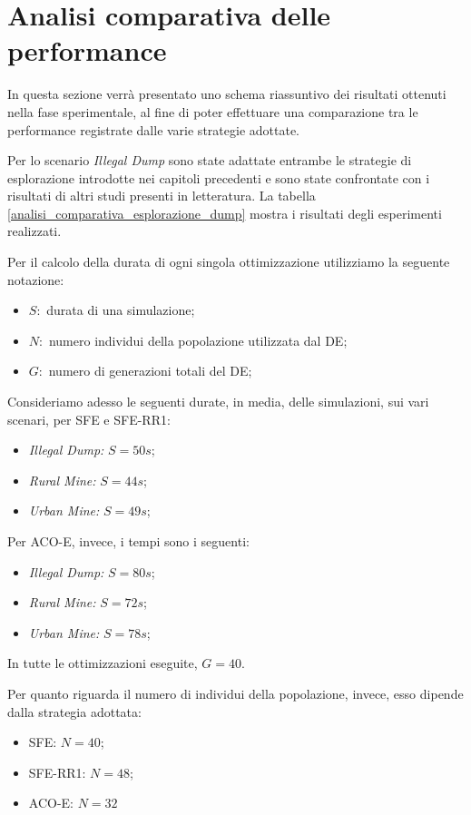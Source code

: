 \newpage
\section{Analisi comparativa delle performance}

In questa sezione verrà presentato uno schema riassuntivo dei risultati ottenuti nella fase sperimentale, al fine di poter effettuare una comparazione tra le performance registrate dalle varie strategie adottate.

Per lo scenario \textit{Illegal Dump} sono state adattate entrambe le strategie di esplorazione introdotte nei capitoli precedenti e sono state confrontate con i risultati di altri studi presenti in letteratura.
La tabella \ref{analisi_comparativa_esplorazione_dump} mostra i risultati degli esperimenti realizzati.

Per il calcolo della durata di ogni singola ottimizzazione utilizziamo la seguente notazione:
\begin{itemize}
    \item $S:$ durata di una simulazione;
    \item $N:$ numero individui della popolazione utilizzata dal DE;
    \item $G:$ numero di generazioni totali del DE;
\end{itemize}
Consideriamo adesso le seguenti durate, in media, delle simulazioni, sui vari scenari, per SFE e SFE-RR1:
\begin{itemize}
    \item \textit{Illegal Dump: }$S = 50s$;
    \item \textit{Rural Mine: }$S = 44s$;
    \item \textit{Urban Mine: }$S = 49s$;
\end{itemize}
Per ACO-E, invece, i tempi sono i seguenti:
\begin{itemize}
    \item \textit{Illegal Dump: }$S = 80s$;
    \item \textit{Rural Mine: }$S = 72s$;
    \item \textit{Urban Mine: }$S = 78s$;
\end{itemize}
In tutte le ottimizzazioni eseguite, $G=40$.

Per quanto riguarda il numero di individui della popolazione, invece, esso dipende dalla strategia adottata:
\begin{itemize}
    \item SFE: $N = 40$;
    \item SFE-RR1: $N = 48$;
    \item ACO-E: $N = 32$
\end{itemize}

